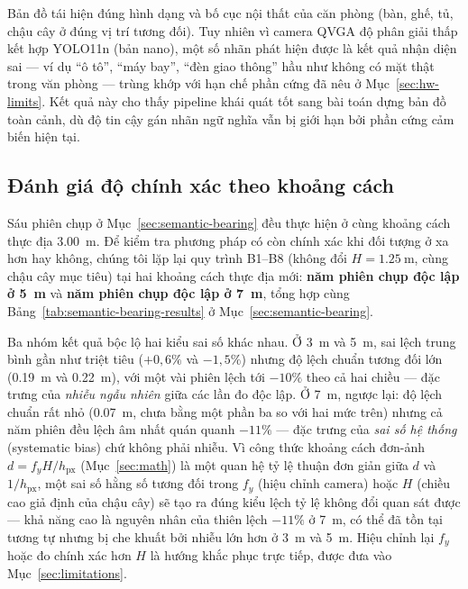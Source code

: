\documentclass[10pt,a4paper,twocolumn]{article}
\begin{document}
Bản đồ tái hiện đúng hình dạng và bố cục nội thất của căn phòng (bàn, ghế, tủ, chậu cây ở đúng vị trí tương đối). Tuy nhiên vì camera QVGA độ phân giải thấp kết hợp YOLO11n (bản nano), một số nhãn phát hiện được là kết quả nhận diện sai — ví dụ ``ô tô'', ``máy bay'', ``đèn giao thông'' hầu như không có mặt thật trong văn phòng — trùng khớp với hạn chế phần cứng đã nêu ở Mục~\ref{sec:hw-limits}. Kết quả này cho thấy pipeline khái quát tốt sang bài toán dựng bản đồ toàn cảnh, dù độ tin cậy gán nhãn ngữ nghĩa vẫn bị giới hạn bởi phần cứng cảm biến hiện tại.

\subsection{Đánh giá độ chính xác theo khoảng cách}
\label{sec:distance-eval}

Sáu phiên chụp ở Mục~\ref{sec:semantic-bearing} đều thực hiện ở cùng khoảng cách thực địa \SI{3.00}{\meter}. Để kiểm tra phương pháp có còn chính xác khi đối tượng ở xa hơn hay không, chúng tôi lặp lại quy trình B1--B8 (không đổi $H=\SI{1.25}{\meter}$, cùng chậu cây mục tiêu) tại hai khoảng cách thực địa mới: \textbf{năm phiên chụp độc lập ở \SI{5}{\meter}} và \textbf{năm phiên chụp độc lập ở \SI{7}{\meter}}, tổng hợp cùng Bảng~\ref{tab:semantic-bearing-results} ở Mục~\ref{sec:semantic-bearing}.

Ba nhóm kết quả bộc lộ hai kiểu sai số khác nhau. Ở \SI{3}{\meter} và \SI{5}{\meter}, sai lệch trung bình gần như triệt tiêu ($+0{,}6\%$ và $-1{,}5\%$) nhưng độ lệch chuẩn tương đối lớn (\SI{0.19}{\meter} và \SI{0.22}{\meter}), với một vài phiên lệch tới $-10\%$ theo cả hai chiều — đặc trưng của \emph{nhiễu ngẫu nhiên} giữa các lần đo độc lập. Ở \SI{7}{\meter}, ngược lại: độ lệch chuẩn rất nhỏ (\SI{0.07}{\meter}, chưa bằng một phần ba so với hai mức trên) nhưng cả năm phiên đều lệch âm nhất quán quanh $-11\%$ — đặc trưng của \emph{sai số hệ thống} (systematic bias) chứ không phải nhiễu. Vì công thức khoảng cách đơn-ảnh $d = f_y H / h_{\text{px}}$ (Mục~\ref{sec:math}) là một quan hệ tỷ lệ thuận đơn giản giữa $d$ và $1/h_{\text{px}}$, một sai số hằng số tương đối trong $f_y$ (hiệu chỉnh camera) hoặc $H$ (chiều cao giả định của chậu cây) sẽ tạo ra đúng kiểu lệch tỷ lệ không đổi quan sát được — khả năng cao là nguyên nhân của thiên lệch $-11\%$ ở \SI{7}{\meter}, có thể đã tồn tại tương tự nhưng bị che khuất bởi nhiễu lớn hơn ở \SI{3}{\meter} và \SI{5}{\meter}. Hiệu chỉnh lại $f_y$ hoặc đo chính xác hơn $H$ là hướng khắc phục trực tiếp, được đưa vào Mục~\ref{sec:limitations}.
\end{document}

